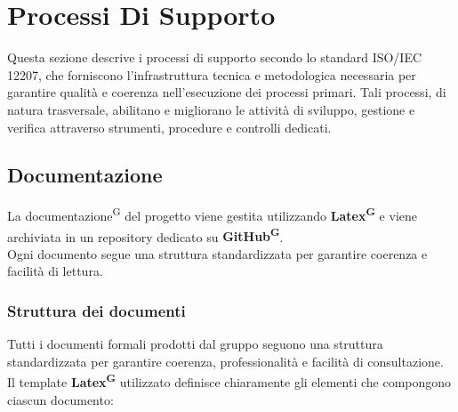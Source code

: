 \documentclass[a4paper, 11pt]{article}
\begin{document}
\section{Processi Di Supporto}
Questa sezione descrive i processi di supporto secondo lo standard ISO/IEC 12207, che forniscono l'infrastruttura tecnica e metodologica necessaria per garantire qualità e coerenza nell'esecuzione dei processi primari. Tali processi, di natura trasversale, abilitano e migliorano le attività di sviluppo, gestione e verifica attraverso strumenti, procedure e controlli dedicati.
\subsection{Documentazione}
La documentazione\textsuperscript{G} del progetto viene gestita utilizzando \textbf{Latex\textsuperscript{G}} e viene archiviata in un repository dedicato su \textbf{GitHub\textsuperscript{G}}. 
\\Ogni documento segue una struttura standardizzata per garantire coerenza e facilità di lettura.

\subsubsection{Struttura dei documenti}

Tutti i documenti formali prodotti dal gruppo seguono una struttura standardizzata per garantire coerenza, professionalità e facilità di consultazione. Il template \textbf{Latex\textsuperscript{G}} utilizzato definisce chiaramente gli elementi che compongono ciascun documento:
\end{document}

